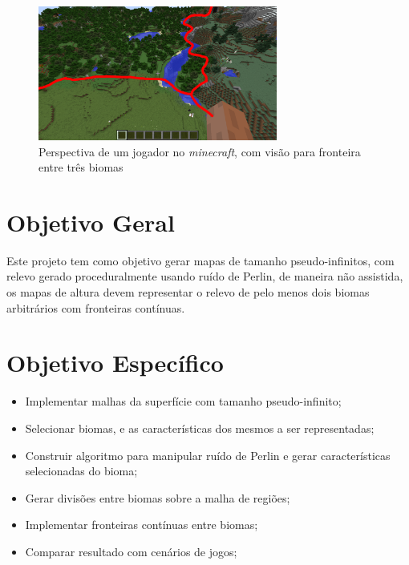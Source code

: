 \begin{figure}[H]
    \centering
    \includegraphics[width=0.7\textwidth]{figuras/biomesminecraftgameplay.png}
    \caption{Perspectiva de um jogador no \textit{minecraft}, com visão para fronteira entre três biomas}
    \label{fig:biomesminecraftgameplay}
\end{figure}

\section{Objetivo Geral}
Este projeto tem como objetivo gerar mapas de tamanho pseudo-infinitos, com 
relevo gerado proceduralmente usando ruído 
de Perlin, de maneira não assistida, os mapas de altura devem representar o 
relevo de pelo menos dois biomas arbitrários com fronteiras contínuas.


\section{Objetivo Específico}

\begin{itemize}
    \item Implementar malhas da superfície com tamanho pseudo-infinito;
    \item Selecionar biomas, e as características dos mesmos a ser representadas;
    \item Construir algoritmo para manipular ruído de Perlin e gerar características
        selecionadas do bioma;
    \item Gerar divisões entre biomas sobre a malha de regiões;
    \item Implementar fronteiras contínuas entre biomas;
    \item Comparar resultado com cenários de jogos;
\end{itemize}

